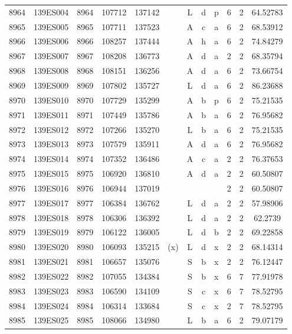 \begin{tabular}{|*{12}{c|}}
8964 & 139ES004 & 8964 & 107712 & 137142 &  & L & d & p & 6 & 2 & 64.52783 \\ 
8965 & 139ES005 & 8965 & 107711 & 137523 &  & A & c & a & 6 & 2 & 68.53912 \\ 
8966 & 139ES006 & 8966 & 108257 & 137444 &  & A & h & a & 6 & 2 & 74.84279 \\ 
8967 & 139ES007 & 8967 & 108208 & 136773 &  & A & d & a & 2 & 2 & 68.35794 \\ 
8968 & 139ES008 & 8968 & 108151 & 136256 &  & A & d & a & 6 & 2 & 73.66754 \\ 
8969 & 139ES009 & 8969 & 107802 & 135727 &  & L & d & a & 6 & 2 & 86.23688 \\ 
8970 & 139ES010 & 8970 & 107729 & 135299 &  & A & b & p & 6 & 2 & 75.21535 \\ 
8971 & 139ES011 & 8971 & 107449 & 135786 &  & A & b & a & 6 & 2 & 76.95682 \\ 
8972 & 139ES012 & 8972 & 107266 & 135270 &  & L & b & a & 6 & 2 & 75.21535 \\ 
8973 & 139ES013 & 8973 & 107579 & 135911 &  & A & d & a & 6 & 2 & 76.95682 \\ 
8974 & 139ES014 & 8974 & 107352 & 136486 &  & A & c & a & 2 & 2 & 76.37653 \\ 
8975 & 139ES015 & 8975 & 106920 & 136810 &  & A & d & a & 2 & 2 & 60.50807 \\ 
8976 & 139ES016 & 8976 & 106944 & 137019 &  &  &  &  & 2 & 2 & 60.50807 \\ 
8977 & 139ES017 & 8977 & 106384 & 136762 &  & L & d & a & 2 & 2 & 57.98906 \\ 
8978 & 139ES018 & 8978 & 106306 & 136392 &  & L & d & a & 2 & 2 & 62.2739 \\ 
8979 & 139ES019 & 8979 & 106122 & 136005 &  & L & d & b & 2 & 2 & 69.22858 \\ 
8980 & 139ES020 & 8980 & 106093 & 135215 & (x) & L & d & x & 2 & 2 & 68.14314 \\ 
8981 & 139ES021 & 8981 & 106657 & 135076 &  & S & b & x & 2 & 2 & 76.12447 \\ 
8982 & 139ES022 & 8982 & 107055 & 134384 &  & S & b & x & 6 & 7 & 77.91978 \\ 
8983 & 139ES023 & 8983 & 106590 & 134109 &  & S & c & x & 6 & 7 & 78.52795 \\ 
8984 & 139ES024 & 8984 & 106314 & 133684 &  & S & c & x & 2 & 7 & 78.52795 \\ 
8985 & 139ES025 & 8985 & 108066 & 134980 &  & L & b & a & 6 & 2 & 79.07179 \\ 

\end{tabular}
